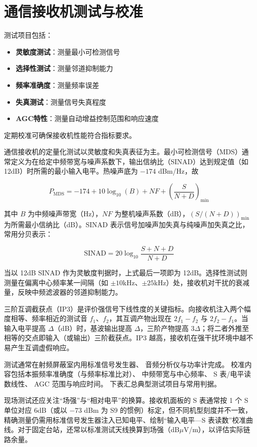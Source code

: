 \section{通信接收机测试与校准}
\label{sec:comm_receiver_testing}

测试项目包括：

\begin{itemize}
    \item \textbf{灵敏度测试}：测量最小可检测信号
    \item \textbf{选择性测试}：测量邻道抑制能力
    \item \textbf{频率准确度}：测量频率误差
    \item \textbf{失真测试}：测量信号失真程度
    \item \textbf{AGC特性}：测量自动增益控制范围和响应速度
\end{itemize}

定期校准可确保接收机性能符合指标要求。

通信接收机的定量化测试以灵敏度和失真表征为主。最小可检测信号（MDS）通常定义为在给定中频带宽与噪声系数下，输出信纳比（SINAD）达到规定值（如 12dB）时所需的最小输入电平。热噪声底为 $-174$ dBm/Hz，故

\[
P_{\mathrm{MDS}}=-174+10\log_{10}(B)+NF+\left(\frac{S}{N+D}\right)_{\min}
\]

其中 $B$ 为中频噪声带宽（Hz），$NF$ 为整机噪声系数（dB），$(S/(N+D))_{\min}$ 为所需最小信纳比（dB）。SINAD 表示信号加噪声加失真与纯噪声加失真之比，常用分贝表示：

\[
\mathrm{SINAD}=20\log_{10}\frac{S+N+D}{N+D}
\]

当以 12dB SINAD 作为灵敏度判据时，上式最后一项即为 12dB。选择性测试则测量在偏离中心频率某一间隔（如 $\pm10$kHz、$\pm25$kHz）处，接收机对干扰的衰减量，反映中频滤波器的邻道抑制能力。

三阶互调截获点（IP3）是评价强信号下线性度的关键指标。向接收机注入两个幅度相等、频率相近的测试音 $f_1$、$f_2$，其互调产物出现在 $2f_1-f_2$ 与 $2f_2-f_1$。当输入电平提高 $\Delta$（dB）时，基波输出提高 $\Delta$，三阶产物提高 $3\Delta$；将二者外推至相等的交点即输入（或输出）三阶截获点。IP3 越高，接收机在强干扰环境中越不易产生互调虚假响应。

测试通常在射频屏蔽室内用标准信号发生器、
音频分析仪与功率计完成。
校准内容包括本振频率准确度（与频率标准比对）、
中频带宽与中心频率、
S 表/电平读数线性、
AGC 范围与响应时间。
下表汇总典型测试项目与常用判据。

现场测试还应关注“场强”与“相对电平”的换算。接收机面板的 S 表通常按 1 个 S 单位对应 6dB（或以 $-73$ dBm 为 S9 的惯例）标定，但不同机型刻度并不一致，精确测量仍需用标准信号发生器注入已知电平、绘制“输入电平—S 表读数”校准曲线。对于固定台站，还常以标准测试天线换算到场强（dB$\mu$V/m），以评估实际链路余量。

